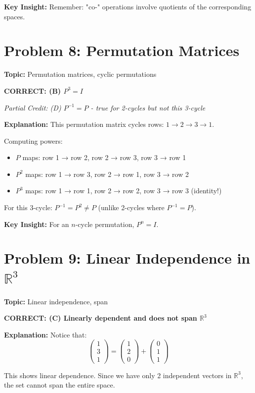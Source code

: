 \documentclass[12pt]{amsart}
\newcommand{\correct}[1]{{\color{blue}\textbf{CORRECT: #1}}}
\newcommand{\partcred}[1]{{\color{red}\textit{Partial Credit: #1}}}
\newcommand{\hint}{\textbf{Key Insight: }}
\begin{document}
\hint Remember: "co-" operations involve quotients of the corresponding spaces.

\hrulefill

\section*{Problem 8: Permutation Matrices}
\textbf{Topic:} Permutation matrices, cyclic permutations

\correct{(B) $P^3 = I$}

\partcred{(D) $P^{-1} = P$ - true for 2-cycles but not this 3-cycle}

\textbf{Explanation:} This permutation matrix cycles rows: $1 \to 2 \to 3 \to 1$.

Computing powers:
\begin{itemize}
\item $P$ maps: row 1 → row 2, row 2 → row 3, row 3 → row 1
\item $P^2$ maps: row 1 → row 3, row 2 → row 1, row 3 → row 2
\item $P^3$ maps: row 1 → row 1, row 2 → row 2, row 3 → row 3 (identity!)
\end{itemize}

For this 3-cycle: $P^{-1} = P^2 \neq P$ (unlike 2-cycles where $P^{-1} = P$).

\hint For an $n$-cycle permutation, $P^n = I$.

\hrulefill

\section*{Problem 9: Linear Independence in $\mathbb{R}^3$}
\textbf{Topic:} Linear independence, span

\correct{(C) Linearly dependent and does not span $\mathbb{R}^3$}

\textbf{Explanation:} Notice that:
$$\begin{pmatrix}1\\3\\1\end{pmatrix} = \begin{pmatrix}1\\2\\0\end{pmatrix} + \begin{pmatrix}0\\1\\1\end{pmatrix}$$

This shows linear dependence. Since we have only 2 independent vectors in $\mathbb{R}^3$, the set cannot span the entire space.
\end{document}
